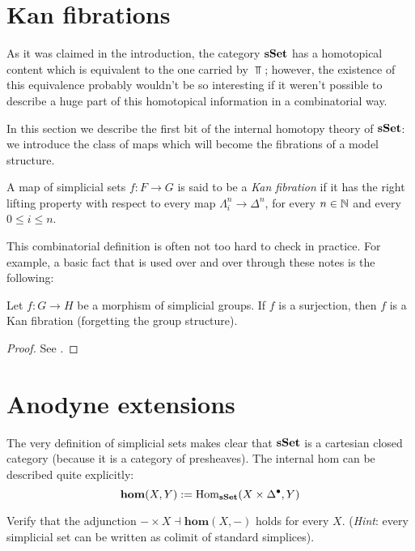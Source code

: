 \begin{refsection}
\section{Kan fibrations}

As it was claimed in the introduction, the category $\mathbf{sSet}$ has a homotopical content which is equivalent to the one carried by $\Top$; however, the existence of this equivalence probably wouldn't be so interesting if it weren't possible to describe a huge part of this homotopical information in a combinatorial way.

In this section we describe the first bit of the internal homotopy theory of $\mathbf{sSet}$: we introduce the class of maps which will become the fibrations of a model structure.

\begin{defin}
A map of simplicial sets $f \colon F \to G$ is said to be a \emph{Kan fibration} if it has the right lifting property with respect to every map $\Lambda^n_i \to \Delta^n$, for every $n \in \mathbb{N}$ and every $0 \le i \le n$.
\end{defin}

This combinatorial definition is often not too hard to check in practice. For example, a basic fact that is used over and over through these notes is the following:

\begin{lemma}
Let $f \colon G \to H$ be a morphism of simplicial groups. If $f$ is a surjection, then $f$ is a Kan fibration (forgetting the group structure).
\end{lemma}

\begin{proof}
See \cite[Lemma 8.2.8]{weibel}.
\end{proof}

\section{Anodyne extensions}

The very definition of simplicial sets makes clear that $\mathbf{sSet}$ is a cartesian closed category (because it is a category of presheaves). The internal hom can be described quite explicitly:
\[
\mathbf{hom}(X,Y) := \mathrm{Hom}_{\mathbf{sSet}}(X \times \Delta^{\bullet}, Y)
\]

\begin{exercise}
Verify that the adjunction $- \times X \dashv \mathbf{hom}(X,-)$ holds for every $X$. (\emph{Hint}: every simplicial set can be written as colimit of standard simplices).
\end{exercise}


\end{refsection}
